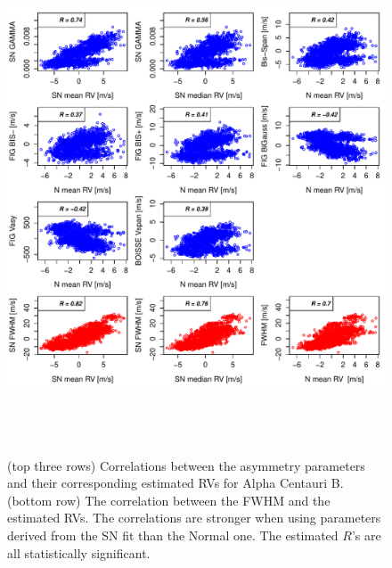 \documentclass{aa}
\begin{document}
\begin{figure}[htbp]
\begin{center}
\includegraphics[height = 6in]{HD12862_[4]Comparison_para.pdf}  
   \caption{(top three rows) Correlations between the asymmetry parameters and their corresponding estimated RVs for Alpha Centauri B. 
(bottom row) The correlation between the FWHM and the estimated RVs. The correlations are stronger when using parameters derived from the SN fit than the Normal one. The estimated $R$'s are all statistically significant.} 
   \label{fig:alphacent:corrPlot}
\end{center}
\end{figure}
%
\end{document}

